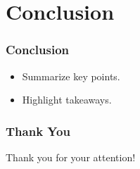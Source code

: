 \documentclass{beamer}
\begin{document}
\section{Conclusion}

\begin{frame}
    \frametitle{Conclusion}
    \begin{itemize}
        \item Summarize key points.
        \item Highlight takeaways.
    \end{itemize}
\end{frame}


\begin{frame}
    \frametitle{Thank You}
    \centering
    \Huge Thank you for your attention!
\end{frame}
\end{document}

